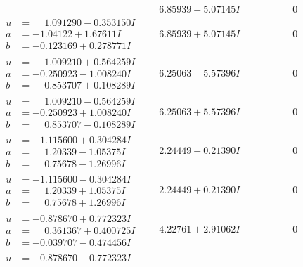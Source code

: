 \documentclass[1p]{elsarticle_modified}
\theoremstyle{definition}
\begin{document}
$$\begin{array}{c|c|c}
 & \phantom{-}6.85939 - 5.07145 I & \phantom{-0.000000 } 0 \\ \hline\begin{aligned}
u &= \phantom{-}1.091290 - 0.353150 I \\
a &= -1.04122 + 1.67611 I \\
b &= -0.123169 + 0.278771 I\end{aligned}
 & \phantom{-}6.85939 + 5.07145 I & \phantom{-0.000000 } 0 \\ \hline\begin{aligned}
u &= \phantom{-}1.009210 + 0.564259 I \\
a &= -0.250923 - 1.008240 I \\
b &= \phantom{-}0.853707 + 0.108289 I\end{aligned}
 & \phantom{-}6.25063 - 5.57396 I & \phantom{-0.000000 } 0 \\ \hline\begin{aligned}
u &= \phantom{-}1.009210 - 0.564259 I \\
a &= -0.250923 + 1.008240 I \\
b &= \phantom{-}0.853707 - 0.108289 I\end{aligned}
 & \phantom{-}6.25063 + 5.57396 I & \phantom{-0.000000 } 0 \\ \hline\begin{aligned}
u &= -1.115600 + 0.304284 I \\
a &= \phantom{-}1.20339 - 1.05375 I \\
b &= \phantom{-}0.75678 - 1.26996 I\end{aligned}
 & \phantom{-}2.24449 - 0.21390 I & \phantom{-0.000000 } 0 \\ \hline\begin{aligned}
u &= -1.115600 - 0.304284 I \\
a &= \phantom{-}1.20339 + 1.05375 I \\
b &= \phantom{-}0.75678 + 1.26996 I\end{aligned}
 & \phantom{-}2.24449 + 0.21390 I & \phantom{-0.000000 } 0 \\ \hline\begin{aligned}
u &= -0.878670 + 0.772323 I \\
a &= \phantom{-}0.361367 + 0.400725 I \\
b &= -0.039707 - 0.474456 I\end{aligned}
 & \phantom{-}4.22761 + 2.91062 I & \phantom{-0.000000 } 0 \\ \hline\begin{aligned}
u &= -0.878670 - 0.772323 I \\

\end{aligned}
\end{array}$$
\end{document}
